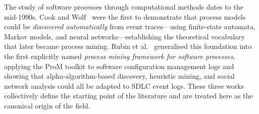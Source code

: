 

The study of software processes through computational methods dates to the
mid-1990s. Cook and Wolf~\cite{cook1995,cook1998} were the first to
demonstrate that process models could be \emph{discovered automatically} from
event traces---using finite-state automata, Markov models, and neural
networks---establishing the theoretical vocabulary that later became process
mining. Rubin et al.~\cite{rubin2007} generalised this foundation into the
first explicitly named \emph{process mining framework for software processes},
applying the ProM toolkit to software configuration management logs and
showing that alpha-algorithm-based discovery, heuristic mining, and social
network analysis could all be adapted to SDLC event logs.
These three works collectively define the starting point of the literature
and are treated here as the canonical origin of the field.



